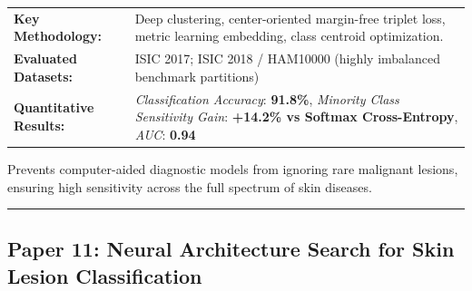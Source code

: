 \documentclass[10pt,a4paper]{article}
\begin{document}
\vspace{4pt}
\begin{tabularx}{\linewidth}{p{3.2cm}X}
\toprule
\textbf{Key Methodology:} & Deep clustering, center-oriented margin-free triplet loss, metric learning embedding, class centroid optimization. \\
\textbf{Evaluated Datasets:} & ISIC 2017; ISIC 2018 / HAM10000 (highly imbalanced benchmark partitions) \\
\textbf{Quantitative Results:} & \textit{Classification Accuracy}: \textbf{91.8\%}, \textit{Minority Class Sensitivity Gain}: \textbf{+14.2\% vs Softmax Cross-Entropy}, \textit{AUC}: \textbf{0.94} \\
\bottomrule
\end{tabularx}
\vspace{4pt}
\begin{tcolorbox}[utilitybox,title=Clinical Utility and Real-World Impact]
Prevents computer-aided diagnostic models from ignoring rare malignant lesions, ensuring high sensitivity across the full spectrum of skin diseases.
\end{tcolorbox}
\vspace{12pt}
\hrule
\vspace{12pt}
\subsection*{Paper 11: Neural Architecture Search for Skin Lesion Classification}
\end{document}
